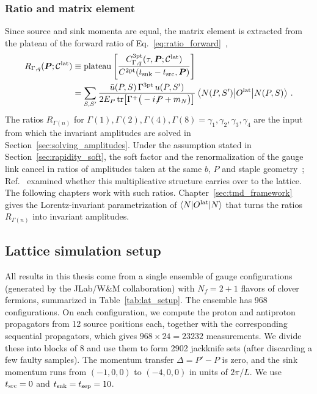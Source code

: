 \subsubsection{Ratio and matrix element}
Since source and sink momenta are equal, the matrix element is extracted from the plateau of the forward ratio of Eq.~\eqref{eq:ratio_forward}~\cite{MuschThesis2, Musch:2011er},
\begin{equation}
\begin{split}
    R_{\Gamma,q}(\boldsymbol{P};\mathcal C^{\rm lat})&\equiv\mathrm{plateau}\left[\frac{C^{\rm 3pt}_{\Gamma,q}(\tau,\boldsymbol{P};\mathcal C^{\rm lat})}{C^{\rm 2pt}(t_{\rm snk}-t_{\rm src},\boldsymbol{P})}\right]\\
    &=\sum_{S,S'}\frac{\bar u(P,S)\,\Gamma^{\rm 3pt}\,u(P,S')}{2E_P\,\mathrm{tr}\big[\Gamma^{+}\big(-i{\not\!P}+m_N\big)\big]}\,\big\langle N(P,S')\big|O^{\rm lat}\big|N(P,S)\big\rangle \ .
\end{split}
    \label{eq:staple_ratio}
\end{equation}
The ratios $R_{\Gamma(n)}$ for $\Gamma(1),\Gamma(2),\Gamma(4),\Gamma(8)=\gamma_1,\gamma_2,\gamma_3,\gamma_4$ are the input from which the invariant amplitudes are solved in Section~\ref{sec:solving_amplitudes}. Under the assumption stated in Section~\ref{sec:rapidity_soft}, the soft factor and the renormalization of the gauge link cancel in ratios of amplitudes taken at the same $b$, $P$ and staple geometry~\cite{Boussarie:2023izj,Yoon:2017qzo}; Ref.~\cite{Yoon:2017qzo} examined whether this multiplicative structure carries over to the lattice. The following chapters work with such ratios. Chapter~\ref{sec:tmd_framework} gives the Lorentz-invariant parametrization of $\langle N|O^{\rm lat}|N\rangle$ that turns the ratios $R_{\Gamma(n)}$ into invariant amplitudes.


\subsection{Lattice simulation setup}
\label{sec:lat_setup}
All results in this thesis come from a single ensemble of gauge configurations (generated by the JLab/W\&M collaboration) with $N_f=2+1$ flavors of clover fermions, summarized in Table~\ref{tab:lat_setup}. The ensemble has 968 configurations. On each configuration, we compute the proton and antiproton propagators from 12 source positions each, together with the corresponding sequential propagators, which gives $968\times24=23232$ measurements. We divide these into blocks of 8 and use them to form 2902 jackknife sets (after discarding a few faulty samples). The momentum transfer $\Delta=P'-P$ is zero, and the sink momentum runs from $(-1,0,0)$ to $(-4,0,0)$ in units of $2\pi/L$. We use $t_{\rm src}=0$ and $t_{\rm snk}=t_{\rm sep}=10$.

